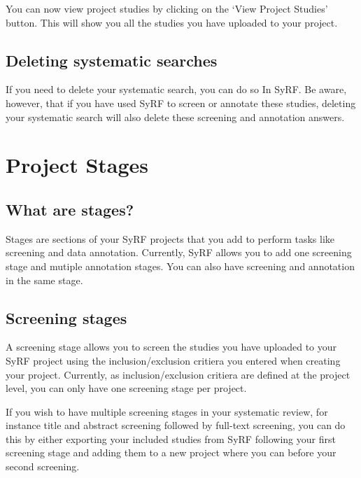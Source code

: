 \documentclass[
]{book}
\begin{document}
You can now view project studies by clicking on the `View Project Studies' button. This will show you all the studies you have uploaded to your project.

\hypertarget{deleting-systematic-searches}{%
\section{Deleting systematic searches}\label{deleting-systematic-searches}}

If you need to delete your systematic search, you can do so In SyRF. Be aware, however, that if you have used SyRF to screen or annotate these studies, deleting your systematic search will also delete these screening and annotation answers.

\hypertarget{stages}{%
\chapter{Project Stages}\label{stages}}

\hypertarget{what-are-stages}{%
\section{What are stages?}\label{what-are-stages}}

Stages are sections of your SyRF projects that you add to perform tasks like screening and data annotation. Currently, SyRF allows you to add one screening stage and mutiple annotation stages. You can also have screening and annotation in the same stage.

\hypertarget{screening-stages}{%
\section{Screening stages}\label{screening-stages}}

A screening stage allows you to screen the studies you have uploaded to your SyRF project using the inclusion/exclusion critiera you entered when creating your project. Currently, as inclusion/exclusion critiera are defined at the project level, you can only have one screening stage per project.

If you wish to have multiple screening stages in your systematic review, for instance title and abstract screening followed by full-text screening, you can do this by either exporting your included studies from SyRF following your first screening stage and adding them to a new project where you can before your second screening.
\end{document}
